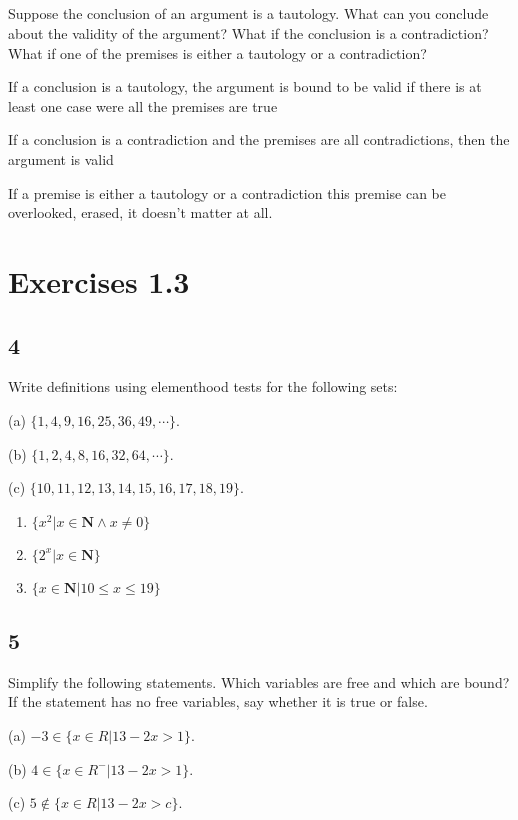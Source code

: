\documentclass{article}
\begin{document}
\subsection{}
Suppose the conclusion of an argument is a tautology. What can you
conclude about the validity of the argument? What if the conclusion is
a contradiction? What if one of the premises is either a tautology or a
contradiction?

If a conclusion is a tautology, the argument is bound to be valid if there is at least one case were all the premises are true

If a conclusion is a contradiction and the premises are all contradictions, then the argument is valid

If a premise is either a tautology or a contradiction this premise can be overlooked, erased, it doesn't matter at all.
\section{Exercises 1.3}
\subsection{4}
Write definitions using elementhood tests for the following sets:

(a) $\{1, 4, 9, 16, 25, 36, 49, \cdots \}$.

(b) $\{1, 2, 4, 8, 16, 32, 64,\cdots \}$.

(c) $\{10, 11, 12, 13, 14, 15, 16, 17, 18, 19 \}$.

\begin{enumerate}[label=(\alph*)]
    \item
    $\{x^2  \vert x \in \mathbf{N} \land x \neq 0\}$
    \item
    $\{2^x  \vert x \in \mathbf {N}\}$
    \item
    $\{ x \in \mathbf{N} \vert 10\leq x \leq 19\}$
\end{enumerate}
\subsection{5}
Simplify the following statements. Which variables are free and
which are bound? If the statement has no free variables, say whether
it is true or false.

(a) $-3 \in \{x \in R \vert 13 - 2x > 1\}$.

(b) $4 \in \{x \in R^-\vert 13 - 2x > 1\}$.

(c) $5 \notin \{x \in R \vert 13 - 2x > c\}$.
\end{document}
